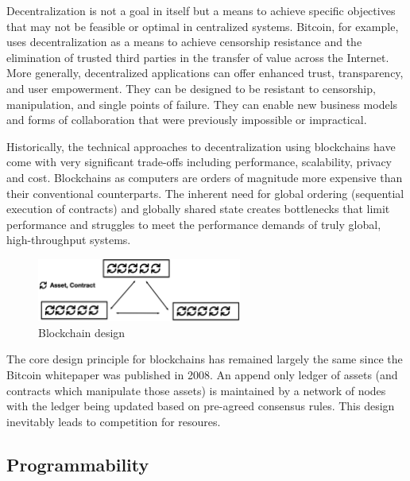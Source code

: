 \documentclass{article}
\begin{document}
Decentralization is not a goal in itself but a means to achieve specific objectives that may not be feasible or optimal in centralized systems. Bitcoin, for example, uses decentralization as a means to achieve censorship resistance and the elimination of trusted third parties in the transfer of value across the Internet. More generally, decentralized applications can offer enhanced trust, transparency, and user empowerment. They can be designed to be resistant to censorship, manipulation, and single points of failure. They can enable new business models and forms of collaboration that were previously impossible or impractical.

Historically, the technical approaches to decentralization using blockchains have come with very significant trade-offs including performance, scalability, privacy and cost. Blockchains as computers are orders of magnitude more expensive than their conventional counterparts. The inherent need for global ordering (sequential execution of contracts) and globally shared state creates bottlenecks that limit performance and struggles to meet the performance demands of truly global, high-throughput systems.


\begin{figure}[H]
    \centering
    \includegraphics[width=0.6\textwidth]{Legacy.png}
    \caption{Blockchain design}
    \label{fig:scaling}
\end{figure}


The core design principle for blockchains has remained largely the same since the Bitcoin whitepaper was published in 2008. An append only ledger of assets (and contracts which manipulate those assets) is maintained by a network of nodes with the ledger being updated based on pre-agreed consensus rules. This design inevitably leads to competition for resoures.

\subsection{Programmability}
\end{document}
